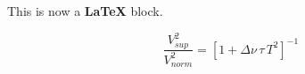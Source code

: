 This is now a \textbf{LaTeX} block. $$

\begin{equation}
\frac{V_{ sup}^2}{V_{ norm}^2} = [1 + \Delta \nu \, \tau \, T^2 ]^{-1} \,
\end{equation}